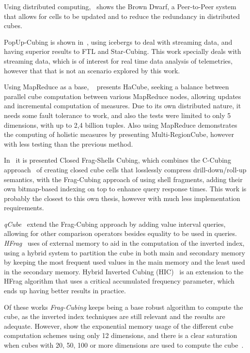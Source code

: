 Using distributed computing,~\cite{dokaBrownDwarfFullydistributed2011} shows the Brown Dwarf, a Peer-to-Peer system that allows for cells to be updated and to reduce the redundancy in distributed cubes.

PopUp-Cubing is shown in~\cite{heinePopUpCubingAlgorithmEfficiently2017}, using icebergs to deal with streaming data, and having superior results to FTL and Star-Cubing.
This work specially deals with streaming data, which is of interest for real time data analysis of telemetries, however that that is not an scenario explored by this work.

Using MapReduce as a base, ~\cite{wangScalableDataCube2013} presents HaCube, seeking a balance between parallel cube computation between various MapReduce nodes, allowing updates and incremental computation of measures.
Due to its own distributed nature, it needs some fault tolerance to work, and also the tests were limited to only 5 dimensions, with up to 2,4 billion tuples.
Also using MapReduce  demonstrates the computing of holistic measures by presenting Multi-RegionCube, however with less testing than the previous method.

In~\cite{zhaoClosedFragShellsCubing2018} it is presented Closed Frag-Shells Cubing, which combines the C-Cubing approach~\cite{dongxinCCubingEfficientComputation2006} of creating closed cube cells that losslessly compress drill-down/roll-up semantics, with the Frag-Cubing approach of using shell fragments, adding their own bitmap-based indexing on top to enhance query response times.
This work is probably the closest to this own thesis, however with much less implementation requirements.

\textit{qCube}~\cite{silvaQCubeEfficientIntegration2013} extend the Frag-Cubing approach by adding value interval queries, allowing for other comparison operators besides equality to be used in queries.
\textit{HFrag}~\cite{silvaHybridMemoryData2015} uses of external memory to aid in the computation of the inverted index, using a hybrid system to partition the cube in both main and secondary memory by keeping the most frequent used values in the main memory and the least used in the secondary memory.
Hybrid Inverted Cubing (HIC)~\cite{silvaComputingBIGData2016} is an extension to the HFrag algorithm that uses a critical accumulated frequency parameter, which ends up having better results in practice.

Of these works \textit{Frag-Cubing} keeps being a base robust algorithm to compute the cube, as the inverted index techniques are still relevant and the results are adequate.
However,  show the exponential memory usage of the different cube computation schemes using only 12 dimensions, and there is a clear saturation when cubes with 20, 50, 100 or more dimensions are used to compute the cube~\cite{silva:2015:abordagensParaCubo}.

